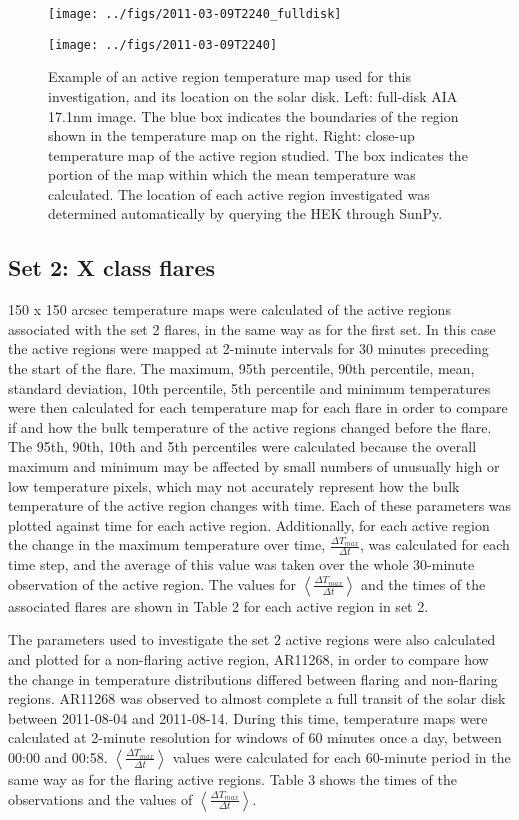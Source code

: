 \documentclass[namedreferences]{solarphysics}
\begin{document}
\begin{article}
\begin{figure}
  \centerline{\texttt{[image: ../figs/2011-03-09T2240\_fulldisk]}}
  \centerline{\texttt{[image: ../figs/2011-03-09T2240]}}
\caption{Example of an active region temperature map used for this investigation, and its location on the solar disk.
Left: full-disk AIA 17.1nm image.
The blue box indicates the boundaries of the region shown in the temperature map on the right.
Right: close-up temperature map of the active region studied.
The box indicates the portion of the map within which the mean temperature was calculated.
The location of each active region investigated was determined automatically by querying the HEK through SunPy.\label{fig:ar-demo}}
\end{figure}

\subsection{Set 2: X class flares}
150 x 150 arcsec temperature maps were calculated of the active regions associated with the set 2 flares, in the same way as for the first set.
In this case the active regions were mapped at 2-minute intervals for 30 minutes preceding the start of the flare.
The maximum, 95th percentile, 90th percentile, mean, standard deviation, 10th percentile, 5th percentile and minimum temperatures were then calculated for each temperature map for each flare in order to compare if and how the bulk temperature of the active regions changed before the flare.
The 95th, 90th, 10th and 5th percentiles were calculated because the overall maximum and minimum may be affected by small numbers of unusually high or low temperature pixels, which may not accurately represent how the bulk temperature of the active region changes with time.
Each of these parameters was plotted against time for each active region.
Additionally, for each active region the change in the maximum temperature over time, $\frac{\Delta T_{max}}{\Delta t}$, was calculated for each time step, and the average of this value was taken over the whole 30-minute observation of the active region.
The values for $\left\langle \frac{\Delta T_{max}}{\Delta t}\right\rangle$ and the times of the associated flares are shown in Table 2 for each active region in set 2. %

The parameters used to investigate the set 2 active regions were also calculated and plotted for a non-flaring active region, AR11268, in order to compare how the change in temperature distributions differed between flaring and non-flaring regions.
AR11268 was observed to almost complete a full transit of the solar disk between 2011-08-04 and 2011-08-14.
During this time, temperature maps were calculated at 2-minute resolution for windows of 60 minutes once a day, between 00:00 and 00:58. $\left\langle \frac{\Delta T_{max}}{\Delta t}\right\rangle$ values were calculated for each 60-minute period in the same way as for the flaring active regions.
Table 3 shows the times of the observations and the values of $\left\langle \frac{\Delta T_{max}}{\Delta t}\right\rangle$.


\end{article}
\end{document}
